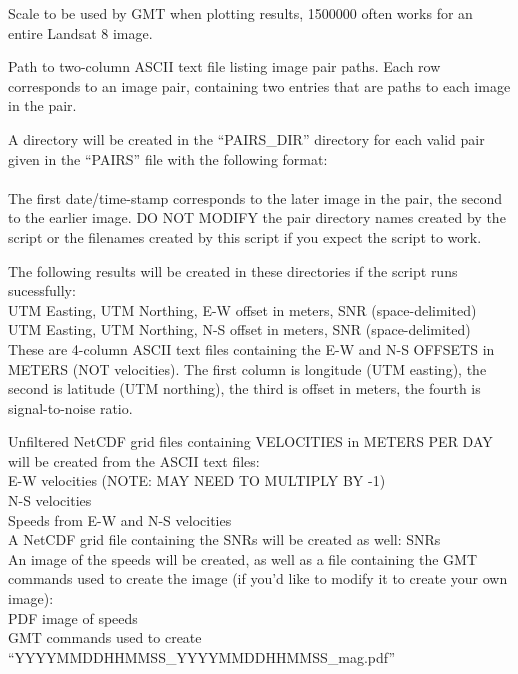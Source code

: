 \documentclass[12pt]{article}
\begin{document}
 Scale to be used by GMT when plotting results, 1500000 often works for an entire Landsat 8 image.

 Path to two-column ASCII text file listing image pair paths.
Each row corresponds to an image pair, containing two entries that are paths to each image in the pair.


A directory will be created in the ``PAIRS\_DIR'' directory for each valid pair given in the ``PAIRS'' file with the following format: \\
 \\
The first date/time-stamp corresponds to the later image in the pair, the second to the earlier image.
DO NOT MODIFY the pair directory names created by the script or the filenames created by this script if you expect the script to work.

\noindent The following results will be created in these directories if the script runs sucessfully: \\
 UTM Easting, UTM Northing, E-W offset in meters, SNR (space-delimited) \\
 UTM Easting, UTM Northing, N-S offset in meters, SNR (space-delimited) \\
\indent These are 4-column ASCII text files containing the E-W and N-S OFFSETS in METERS (NOT velocities).
The first column is longitude (UTM easting), the second is latitude (UTM northing), the third is offset in meters, the fourth is signal-to-noise ratio.

\noindent Unfiltered NetCDF grid files containing VELOCITIES in METERS PER DAY will be created from the ASCII text files: \\
 E-W velocities (NOTE: MAY NEED TO MULTIPLY BY -1) \\
 N-S velocities \\
 Speeds from E-W and N-S velocities \\
\noindent A NetCDF grid file containing the SNRs will be created as well:
 SNRs \\
\noindent An image of the speeds will be created, as well as a file containing the GMT commands used to create the image (if you'd like to modify it to create your own image): \\
 PDF image of speeds \\
 GMT commands used to create ``YYYYMMDDHHMMSS\_YYYYMMDDHHMMSS\_mag.pdf''
\end{document}
